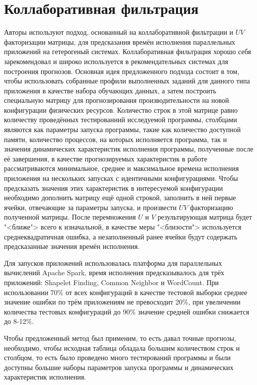 	\section{Коллаборативная фильтрация}
		Авторы \cite{UV_matrix} используют подход, основанный на коллаборативной фильтрации и \(UV\) факторизации матрицы, для предсказания времён исполнения параллельных приложений на гетерогеный системах. Коллаборативная фильтрация хорошо себя зарекомендовал и широко используется в рекомендательных системах для построения прогнозов. Основная идея предложенного подхода состоит в том, чтобы использовать собранные профили выполненных заданий для данного типа приложения в качестве набора обучающих данных, а затем построить специальную матрицу для прогнозирования производительности на новой конфигурации физических ресурсов. Количество строк в этой матрице равно количеству проведённых тестированний исследуемой программы, столбцами являются как параметры запуска программы, такие как количество доступной памяти, количество процессов, на которых исполняется программа, так и значения динамических характеристик исполнения программы, полученные после её завершения, в качестве прогнозируемых характеристик в работе рассматриваются минимальное, среднее и максимальное времена исполнения приложения на нескольких запусках с идентичными конфигурациями. Чтобы предсказать значения этих характеристик в интересуемой конфигурации необходимо дополнить матрицу ещё одной строкой, заполнить в ней первые ячейки, отвечающие за параметры запуска, и произвести \(UV\) факторизацию полученной матрицы. После перемножения \(U\) и \(V\) результирующая матрица будет "<ближе"> всего к изначальной, в качестве меры "<близости"> используется среднеквадратичная ошибка, а незаполненный ранее ячейки будут содержать предсказанные значения времён исполнения.

		Для запусков приложений использовалась платформа для параллельных вычислений Apache Spark, время исполнения предсказывалось для трёх приложений: Shapelet Finding, Common Neighbor и WordCount. При использовании 70\% от всех конфигураций в качестве тестовой выборки среднее значение ошибки по трём приложениям не превосходит 20\%, при увеличении количества тестовых конфигураций до 90\% значение средней ошибки снижается до 8-12\%.

		Чтобы предложенный метод был применим, то есть давал точные прогнозы, необходимо, чтобы исходная таблица обладала большим количеством строк и столбцом, то есть было проведено много тестирований программы и были доступны большие наборы параметров запуска программы и динамических характеристик исполнения.

